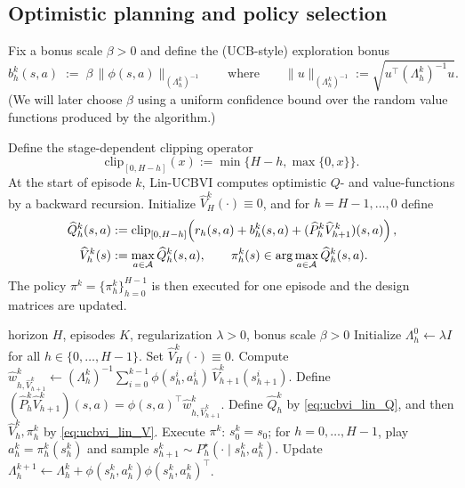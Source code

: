 \subsection{Optimistic planning and policy selection}
\label{subsec:linear_mdp_ucbvi_alg}

Fix a bonus scale $\beta>0$ and define the (UCB-style) exploration bonus
\[
b_h^k(s,a) \;:=\; \beta\,\|\phi(s,a)\|_{(\Lambda_h^k)^{-1}}
\qquad\text{where}\qquad
\|u\|_{(\Lambda_h^k)^{-1}}:=\sqrt{u^\top(\Lambda_h^k)^{-1}u}.
\]
(We will later choose $\beta$ using a uniform confidence bound over the random value
functions produced by the algorithm.)

Define the stage-dependent clipping operator
\[
\mathrm{clip}_{[0,H-h]}(x):=\min\{H-h,\max\{0,x\}\}.
\]
At the start of episode $k$, Lin-UCBVI computes optimistic $Q$- and value-functions by a
backward recursion.  Initialize $\widehat V_H^k(\cdot)\equiv 0$, and for $h=H-1,\dots,0$
define
\begin{align}
\widehat Q_h^k(s,a)
&:=
\mathrm{clip}_{[0,H-h]}\!\left(
r_h(s,a) + b_h^k(s,a) + (\widehat P_h^k \widehat V_{h+1}^k)(s,a)
\right),
\label{eq:ucbvi_lin_Q}\\
\widehat V_h^k(s)
&:= \max_{a\in\mathcal{A}}\widehat Q_h^k(s,a),
\qquad
\pi_h^k(s)\in\arg\max_{a\in\mathcal{A}}\widehat Q_h^k(s,a).
\label{eq:ucbvi_lin_V}
\end{align}
The policy $\pi^k=\{\pi_h^k\}_{h=0}^{H-1}$ is then executed for one episode and the
design matrices are updated.

\begin{algorithm}[t]
\begin{algorithmic}[1]
\Require horizon $H$, episodes $K$, regularization $\lambda>0$, bonus scale $\beta>0$
\State Initialize $\Lambda_h^0 \gets \lambda I$ for all $h\in\{0,\dots,H-1\}$.
    \State Set $\widehat V_H^k(\cdot)\equiv 0$.
        \State Compute $\widehat w_{h,\widehat V_{h+1}^k}^k
        \gets (\Lambda_h^k)^{-1}\sum_{i=0}^{k-1}\phi(s_h^i,a_h^i)\,\widehat V_{h+1}^k(s_{h+1}^i)$.
        \State Define $(\widehat P_h^k\widehat V_{h+1}^k)(s,a)=\phi(s,a)^\top \widehat w_{h,\widehat V_{h+1}^k}^k$.
        \State Define $\widehat Q_h^k$ by \eqref{eq:ucbvi_lin_Q}, and then $\widehat V_h^k,\pi_h^k$ by \eqref{eq:ucbvi_lin_V}.
    \EndFor
    \State Execute $\pi^k$: $s_0^k=s_0$; for $h=0,\dots,H-1$, play $a_h^k=\pi_h^k(s_h^k)$ and sample
    $s_{h+1}^k\sim P_h^\star(\cdot\mid s_h^k,a_h^k)$.
        \State Update $\Lambda_h^{k+1}\gets \Lambda_h^k + \phi(s_h^k,a_h^k)\phi(s_h^k,a_h^k)^\top$.
    \EndFor
\EndFor
\end{algorithmic}
\caption{Lin-UCBVI (least-squares value iteration with UCB bonus)}
\label{alg:lin_ucbvi}
\end{algorithm}

